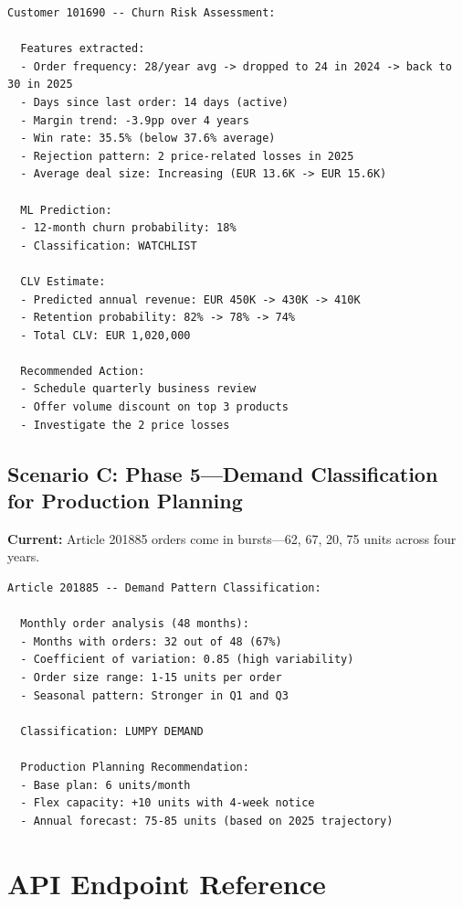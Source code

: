 \documentclass[11pt,a4paper]{article}
\begin{document}
\begin{lstlisting}
Customer 101690 -- Churn Risk Assessment:

  Features extracted:
  - Order frequency: 28/year avg -> dropped to 24 in 2024 -> back to 30 in 2025
  - Days since last order: 14 days (active)
  - Margin trend: -3.9pp over 4 years
  - Win rate: 35.5% (below 37.6% average)
  - Rejection pattern: 2 price-related losses in 2025
  - Average deal size: Increasing (EUR 13.6K -> EUR 15.6K)

  ML Prediction:
  - 12-month churn probability: 18%
  - Classification: WATCHLIST

  CLV Estimate:
  - Predicted annual revenue: EUR 450K -> 430K -> 410K
  - Retention probability: 82% -> 78% -> 74%
  - Total CLV: EUR 1,020,000

  Recommended Action:
  - Schedule quarterly business review
  - Offer volume discount on top 3 products
  - Investigate the 2 price losses
\end{lstlisting}

\subsection{Scenario C: Phase 5---Demand Classification for Production Planning}

\textbf{Current:} Article 201885 orders come in bursts---62, 67, 20, 75 units across four years.

\begin{lstlisting}
Article 201885 -- Demand Pattern Classification:

  Monthly order analysis (48 months):
  - Months with orders: 32 out of 48 (67%)
  - Coefficient of variation: 0.85 (high variability)
  - Order size range: 1-15 units per order
  - Seasonal pattern: Stronger in Q1 and Q3

  Classification: LUMPY DEMAND

  Production Planning Recommendation:
  - Base plan: 6 units/month
  - Flex capacity: +10 units with 4-week notice
  - Annual forecast: 75-85 units (based on 2025 trajectory)
\end{lstlisting}

\section{API Endpoint Reference}
\end{document}
